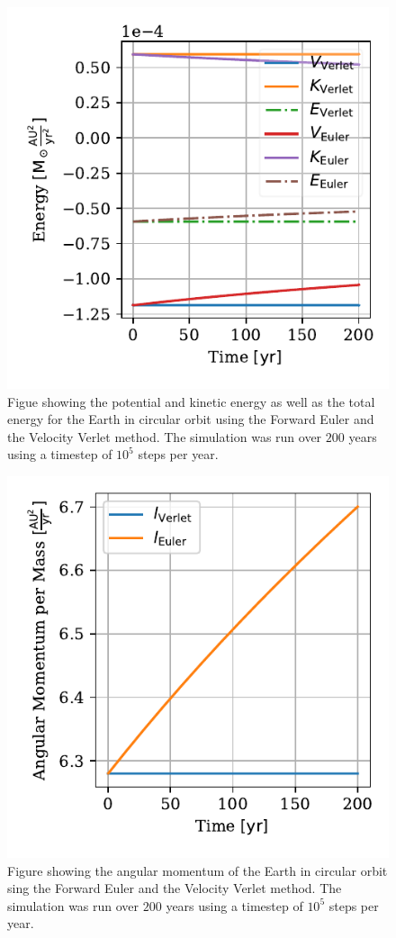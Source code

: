 \documentclass[twocolumn]{aastex62}
\begin{document}
\begin{figure}
\includegraphics[scale=1]{Figures/taskb_energies.pdf}
\caption{Figue showing the potential and kinetic energy as well as the total energy for the Earth in circular orbit using the Forward Euler and the Velocity Verlet method. The simulation was run over $200$ years using a timestep of $10^5$ steps per year.}
\label{fig:energy}
\end{figure}

\begin{figure}
\includegraphics[scale=1]{Figures/taskb_angmom.pdf}
\caption{Figure showing the angular momentum of the Earth in circular orbit sing the Forward Euler and the Velocity Verlet method. The simulation was run over $200$ years using a timestep of $10^5$ steps per year.}
\label{fig:angmom}
\end{figure}
\end{document}
